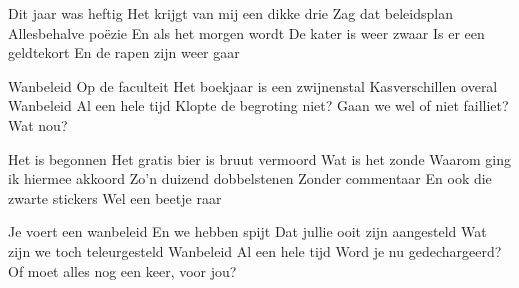 \begin{verse*}
Dit jaar was heftig
Het krijgt van mij een dikke drie
Zag dat beleidsplan
Allesbehalve poëzie
En als het morgen wordt
De kater is weer zwaar
Is er een geldtekort
En de rapen zijn weer gaar
\end{verse*}

\begin{chorus}
Wanbeleid
Op de faculteit
Het boekjaar is een zwijnenstal
Kasverschillen overal
Wanbeleid
Al een hele tijd
Klopte de begroting niet?
Gaan we wel of niet failliet? Wat nou?
\end{chorus}

\begin{verse*}
Het is begonnen
Het gratis bier is bruut vermoord
Wat is het zonde
Waarom ging ik hiermee akkoord
Zo'n duizend dobbelstenen
Zonder commentaar
En ook die zwarte stickers
Wel een beetje raar
\end{verse*}

\begin{verse*}
Je voert een wanbeleid
En we hebben spijt
Dat jullie ooit zijn aangesteld
Wat zijn we toch teleurgesteld
Wanbeleid
Al een hele tijd
Word je nu gedechargeerd?
Of moet alles nog een keer, voor jou?
\end{verse*}

\thechorus